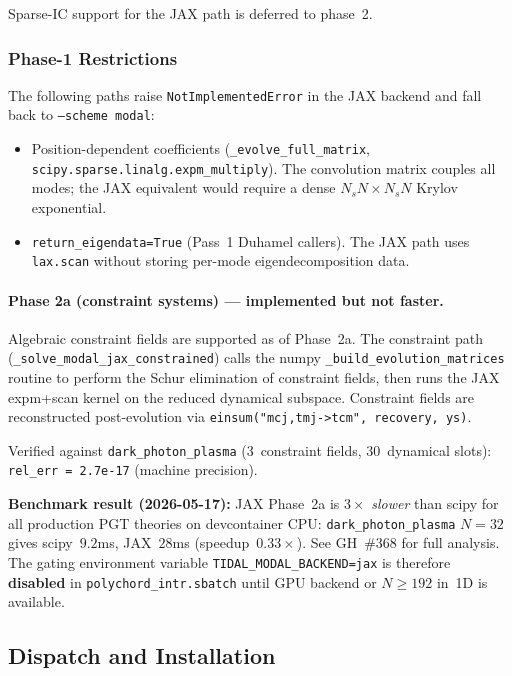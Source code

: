 Sparse-IC support for the JAX path is deferred to phase~2.

\subsubsection{Phase-1 Restrictions}
\label{sec:modal_jax_phase1}

The following paths raise \texttt{NotImplementedError} in the JAX backend
and fall back to \texttt{--scheme modal}:

\begin{itemize}
  \item Position-dependent coefficients (\texttt{\_evolve\_full\_matrix},
    \texttt{scipy.sparse.linalg.expm\_multiply}).  The convolution matrix
    couples all modes; the JAX equivalent would require a dense
    $N_s N \times N_s N$ Krylov exponential.
  \item \texttt{return\_eigendata=True} (Pass~1 Duhamel callers).  The JAX
    path uses \texttt{lax.scan} without storing per-mode eigendecomposition
    data.
\end{itemize}

\paragraph{Phase 2a (constraint systems) — implemented but not faster.}
Algebraic constraint fields are supported as of Phase~2a.  The constraint
path (\texttt{\_solve\_modal\_jax\_constrained}) calls the numpy
\texttt{\_build\_evolution\_matrices} routine to perform the Schur
elimination of constraint fields, then runs the JAX expm+scan kernel on the
reduced dynamical subspace.  Constraint fields are reconstructed
post-evolution via \texttt{einsum("mcj,tmj->tcm", recovery, ys)}.

Verified against \texttt{dark\_photon\_plasma} (3~constraint fields,
30~dynamical slots): \texttt{rel\_err = 2.7e-17} (machine precision).

\textbf{Benchmark result (2026-05-17):} JAX Phase~2a is $3\times$
\emph{slower} than scipy for all production PGT theories on devcontainer
CPU: \texttt{dark\_photon\_plasma} $N=32$ gives scipy~$9.2$ms,
JAX~$28$ms (speedup~$0.33\times$).  See GH~\#368 for full analysis.
The gating environment variable \verb|TIDAL_MODAL_BACKEND=jax| is
therefore \textbf{disabled} in \texttt{polychord\_intr.sbatch} until GPU
backend or $N\geq192$ in~1D is available.

\subsection{Dispatch and Installation}
\label{sec:modal_jax_dispatch}

